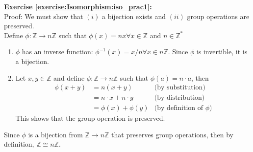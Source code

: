 \noindent\textbf{Exercise \ref{exercise:Isomorphism:iso_prac1}:}
\\
Proof:  We must show that $(i)$ a bijection exists and $(ii)$ group operations are preserved.
\\
Define $\phi: {\mathbb Z} \rightarrow n{\mathbb Z}$ such that $\phi(x) = nx \forall x \in {\mathbb Z}$ and $n \in {\mathbb Z}^*$
\begin{enumerate}[($i$)]
\item
$\phi$ has an inverse function:  $\phi^{-1}(x) = x/n \forall x \in n{\mathbb Z}$.  Since $\phi$ is invertible, it is a bijection.

\item
Let $x, y \in {\mathbb Z}$ and define $\phi: {\mathbb Z} \rightarrow n{\mathbb Z}$ such that $\phi(a) = n\cdot a$, then
\\
\begin{align*}
\phi(x + y) &= n(x + y) &\text{(by substitution)}
\\
&= n\cdot x + n\cdot y &\text{(by distribution)}
\\
&= \phi(x) + \phi(y) &\text{(by definition of\ } \phi)
\end{align*}
This shows that the group operation is preserved.  
\end{enumerate}
Since $\phi$  is a bijection from ${\mathbb Z} \rightarrow n{\mathbb Z}$ that preserves group operations, then by definition, ${\mathbb Z} \cong n{\mathbb Z}$.
\\
\\

